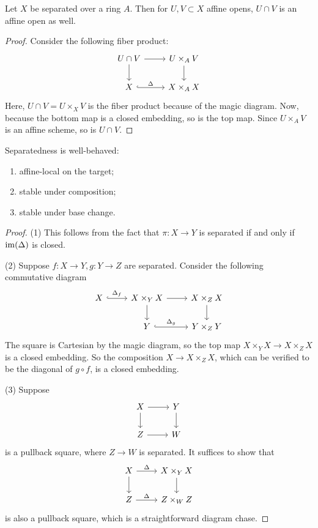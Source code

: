 \documentclass[11pt]{amsart}
\begin{document}
\begin{prop}
Let $X$ be separated over a ring $A$. Then for $U,V\subset X$ affine opens, $U\cap V$ is an affine open as well.
\end{prop}

\begin{proof}
Consider the following fiber product:
\[
\begin{tikzcd}
U\cap V \arrow[r] \arrow[d] & U\times_A V \arrow[d] \\
X \arrow[r, hook, "\Delta"] & X\times_A X
\end{tikzcd}
\]
Here, $U\cap V = U\times_X V$ is the fiber product because of the magic diagram. Now, because the bottom map is a closed embedding, so is the top map. Since $U\times_A V$ is an affine scheme, so is $U\cap V$.
\end{proof}


\begin{prop}
Separatedness is well-behaved:
\begin{enumerate}[(1)]
    \item affine-local on the target;
    \item stable under composition;
    \item stable under base change.
\end{enumerate}
\end{prop}

\begin{proof}
(1) This follows from the fact that $\pi: X\to Y$ is separated if and only if $\operatorname{im}(\Delta)$ is closed.

(2) Suppose $f:X\to Y, g:Y\to Z$ are separated. Consider the following commutative diagram
\[
\begin{tikzcd}
X \arrow[r, hook, "\Delta_f"] & X\times_Y X \arrow[r] \arrow[d] & X\times_Z X \arrow[d] \\
& Y \arrow[r, hook, "\Delta_g"] & Y\times_Z Y
\end{tikzcd}
\]
The square is Cartesian by the magic diagram, so the top map $X\times_Y X\to X\times_Z X$ is a closed embedding. So the composition $X\to X\times_Z X$, which can be verified to be the diagonal of $g\circ f$, is a closed embedding.

(3) Suppose
\[
\begin{tikzcd}
X \arrow[r] \arrow[d] & Y \arrow[d] \\
Z \arrow[r] & W
\end{tikzcd}
\]
is a pullback square, where $Z\to W$ is separated. It suffices to show that
\[
\begin{tikzcd}
X \arrow[r, "\Delta"] \arrow[d] & X\times_Y X \arrow[d] \\
Z \arrow[r, "\Delta"] & Z\times_W Z
\end{tikzcd}
\]
is also a pullback square, which is a straightforward diagram chase.
\end{proof}
\end{document}
